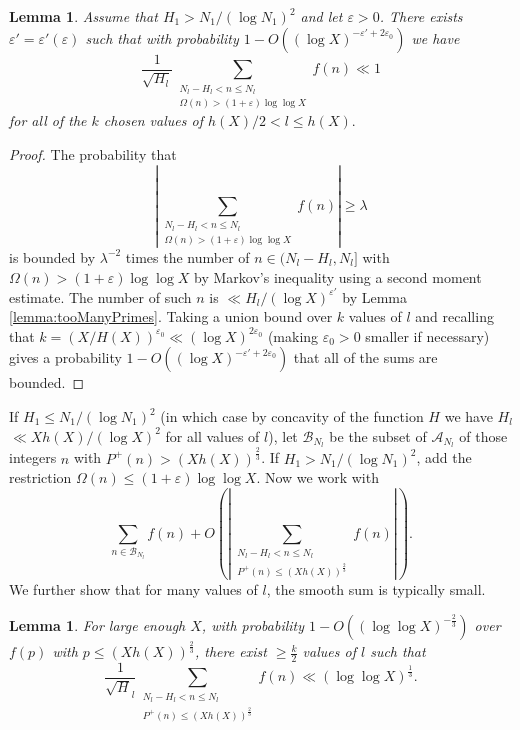 \documentclass[11pt]{tran-l}
\newtheorem{lemma}[theorem]{Lemma}
\theoremstyle{definition}
\theoremstyle{remark}
\numberwithin{equation}{section}
\begin{document}
\begin{lemma}\label{lemma:ignoreTooManyPrimesShort}
Assume that $H_1 > N_1/(\log N_1)^2$ and let $\varepsilon>0$. There exists $\varepsilon' = \varepsilon'(\varepsilon)$ such that with probability $1-O((\log X)^{-\varepsilon'+2\varepsilon_0})$ we have 
\begin{equation*}
    \frac{1}{\sqrt{H_l}}\sum_{\substack{N_l-H_l<n\leq N_l \\ \Omega(n)>(1+\varepsilon)\log\log X}} f(n)\ll1
\end{equation*} for all of the $k$ chosen values of $h(X)/2<l\leq h(X).$\end{lemma}

\begin{proof}
    The probability that $$\left\lvert\sum_{\substack{N_l - H_l < n\leq N_l \\ \Omega(n)>(1+\varepsilon)\log\log X}} f(n)\right\rvert\geq\lambda$$ is bounded by $\lambda^{-2}$ times the number of $n\in (N_l - H_l, N_l]$ with $\Omega(n)>(1+\varepsilon)\log\log X$ by Markov's inequality using a second moment estimate. The number of such $n$ is $\ll H_l/(\log X)^{\varepsilon'}$ by Lemma \ref{lemma:tooManyPrimes}. Taking a union bound over $k$ values of  $l$ and recalling that $k=(X/H(X))^{\varepsilon_0}\ll (\log X)^{2\varepsilon_0}$ (making $\varepsilon_0>0$ smaller if necessary) gives a probability $1-O((\log X)^{-\varepsilon'+2\varepsilon_0})$ that all of the sums are bounded. 
\end{proof}

If $H_1\leq N_1/(\log N_1)^2$ (in which case by concavity of the function $H$ we have $H_l$  \linebreak$\ll Xh(X)/(\log X)^2$ for all values of $l$), let $\mathcal B_{N_l}$ be the subset of $\mathcal A_{N_l}$ of those integers $n$ with $P^+(n)>(Xh(X))^{\frac{2}{3}}$. If $H_1> N_1/(\log N_1)^2$, add the restriction $\Omega(n)\leq(1+\varepsilon)\log\log X$. Now we work with 
\begin{equation*}
    \sum_{n\in\mathcal B_{N_l}}f(n) + O\left(\left\lvert\sum_{\substack{N_l-H_l<n\leq N_l \\  P^+(n)\leq (Xh(X))^{\frac{2}{3}}}}f(n)\right\rvert\right).
\end{equation*}
We further show that for many values of $l$, the smooth sum is typically small. 

\begin{lemma}\label{lemma:ignoresmoothShort}
    For large enough $X$, with probability $1-O((\log \log X)^{-\frac{2}{3}})$ over $f(p)$ with $p\leq (Xh(X))^{\frac{2}{3}}$, there exist $\geq \frac{k}{2}$ values of $l$ such that 
    \begin{equation*}
        \frac{1}{\sqrt H_l}\sum_{\substack{N_l-H_l<n\leq N_l \\ P^+(n)\leq (Xh(X))^{\frac{2}{3}}}}f(n)\ll (\log\log X)^{\frac{1}{3}}.    \end{equation*}
\end{lemma} 
\end{document}
